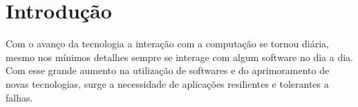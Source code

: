 \documentclass[12pt,
openright, 
oneside,
a4paper,
brazil]{facom-ufu-abntex2}
\theoremstyle{definition}
\begin{document}
\imprimircapa
\imprimirfolhaderosto









\tableofcontents*
\cleardoublepage


\textual


\chapter{Introdução}

Com o avanço da tecnologia a interação com a computação se tornou diária, mesmo
nos mínimos detalhes sempre se interage com algum software no dia a dia. Com
esse grande aumento na utilização de softwares e do aprimoramento de novas tecnologias, 
surge a necessidade de aplicações resilientes e tolerantes a falhas. 
\end{document}
